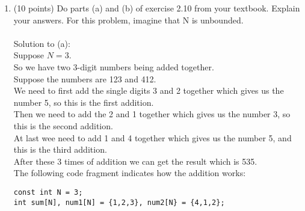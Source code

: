 \documentclass[12pt]{article}
\begin{document}
\begin{enumerate}
\item (10 points) Do parts (a) and (b) of exercise 2.10 from your textbook. Explain your answers. For this problem, imagine that N is unbounded. 
\\\\Solution to (a):
\\Suppose $N = 3$.
\\So we have two 3-digit numbers being added together.
\\Suppose the numbers are 123 and 412.
\\We need to first add the single digits 3 and 2 together which gives us the number 5, so this is the first addition.
\\Then we need to add the 2 and 1 together which gives us the number 3, so this is the second addition.
\\At last wee need to add 1 and 4 together which gives us the number 5, and this is the third addition.
\\After these 3 times of addition we can get the result which is 535. 
\\The following code fragment indicates how the addition works:
\\
\begin{verbatim}
const int N = 3;
int sum[N], num1[N] = {1,2,3}, num2[N} = {4,1,2};


\end{verbatim}
\end{enumerate}
\end{document}
